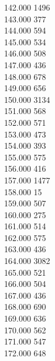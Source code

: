{ 142.000	1496 \\
 143.000	377 \\
 144.000	594 \\
 145.000	534 \\
 146.000	508 \\
 147.000	436 \\
 148.000	678 \\
 149.000	656 \\
 150.000	3134 \\
 151.000	568 \\
 152.000	571 \\
 153.000	473 \\
 154.000	393 \\
 155.000	575 \\
 156.000	416 \\
 157.000	1477 \\
 158.000	15 \\
 159.000	507 \\
 160.000	275 \\
 161.000	514 \\
 162.000	575 \\
 163.000	436 \\
 164.000	3082 \\
 165.000	521 \\
 166.000	504 \\
 167.000	436 \\
 168.000	690 \\
 169.000	636 \\
 170.000	562 \\
 171.000	547 \\
 172.000	648 \\
}
